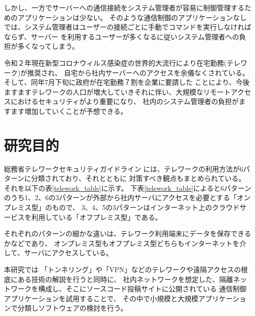 \documentclass[11pt,a4j,titlepage]{jreport}
\begin{document}
しかし、一方でサーバーへの通信接続をシステム管理者が容易に制御管理するためのアプリケーションは少ない。
そのような通信制御のアプリケーションなしでは、システム管理者はユーザーの接続ごとに手動でコマンドを実行しなければならず、サーバー
を利用するユーザーが多くなるに従いシステム管理者への負担が多くなってしまう。\par
令和２年現在新型コロナウィルス感染症の世界的大流行により在宅勤務(テレワーク)が推奨され、
自宅から社内サーバーへのアクセスを余儀なくされている。そして、同年7月下旬に政府が在宅勤務７割を企業に要請した \cite{covid_nikkei}
ことにより、今後ますますテレワークの人口が増大していきそれに伴い、大規模なリモートアクセスにおけるセキュリティがより重要になり、
社内のシステム管理者の負担がますます増加していくことが予想できる。\par 





\section{研究目的}


総務省テレワークセキュリティガイドライン \cite{telework_guideline}には、テレワークの利用方法が6パターンに分類されており、それとともに
対策すべき観点もまとめられている。それを以下の表\ref{telework_table}に示す。
下表\ref{telework_table}によると6パターンのうち1、2、6の3パターンが外部から社内サーバにアクセスを必要とする「オンプレミス型」のもので、
3、4、5の3パターンはインターネット上のクラウドサービスを利用している「オフプレミス型」である。

それぞれのパターンの細かな違いは、テレワーク利用端末にデータを保存できるかなどであり、
オンプレミス型もオフプレミス型どちらもインターネットを介して、サーバにアクセスしている。
\par 本研究では
「トンネリング」や「VPN」などのテレワークや遠隔アクセスの根底にある技術の解説を行うと同時に、
社内ネットワークを想定した、隔離ネットワークを構成し、そこにソースコード投稿サイトに公開されている
通信制御アプリケーションを試用することで、
その中で小規模と大規模アプリケーションで分類しソフトウェアの検討を行う。
\end{document}
